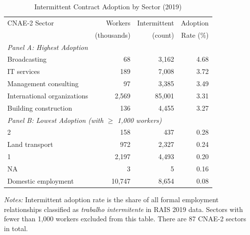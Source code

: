 \begin{table}[htbp]
\centering
\caption{Intermittent Contract Adoption by Sector (2019)}
\label{tab:sectors}
\begin{tabular}{lrrr}
\hline\hline
CNAE-2 Sector & Workers & Intermittent & Adoption \\
 & (thousands) & (count) & Rate (\%) \\
\hline
\multicolumn{4}{l}{\textit{Panel A: Highest Adoption}} \\
Broadcasting & 68 & 3,162 & 4.68 \\
IT services & 189 & 7,008 & 3.72 \\
Management consulting & 97 & 3,385 & 3.49 \\
International organizations & 2,569 & 85,001 & 3.31 \\
Building construction & 136 & 4,455 & 3.27 \\
\hline
\multicolumn{4}{l}{\textit{Panel B: Lowest Adoption (with $\geq$ 1,000 workers)}} \\
2 & 158 & 437 & 0.28 \\
Land transport & 972 & 2,327 & 0.24 \\
1 & 2,197 & 4,493 & 0.20 \\
NA & 3 & 5 & 0.16 \\
Domestic employment & 10,747 & 8,654 & 0.08 \\
\hline\hline
\end{tabular}
\begin{tablenotes}
\item \textit{Notes:} Intermittent adoption rate is the share of all formal employment relationships classified as \textit{trabalho intermitente} in RAIS 2019 data. Sectors with fewer than 1,000 workers excluded from this table. There are 87 CNAE-2 sectors in total.
\end{tablenotes}
\end{table}
